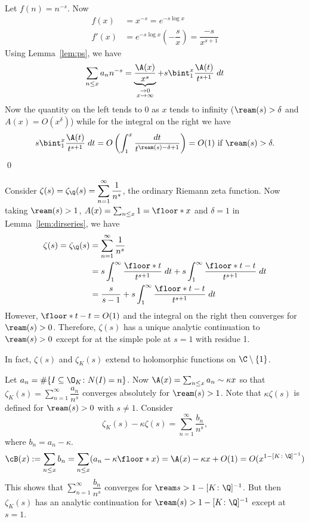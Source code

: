 \pf Let $f(n)= n^{-s}$. Now
	\[
	\begin{split}
	f(x)&=x^{-s}= e^{-s \log x} \\
	f'(x)&= e^{-s \log x} \left(- \dfrac{s}{x}\right)= \dfrac{-s}{x^{s+1}}
	\end{split}
	\]
Using Lemma~\ref{lem:ps}, we have
	\[
	\sum_{n \leq x} a_n n^{-s} = \underbrace{\dfrac{\A(x)}{x^s}}_{\substack{\to 0 \\ x \to \infty}} + s \bint_1^x \dfrac{\A(t)}{t^{s+1}} \; dt
	\]
Now the quantity on the left tends to 0 as $x$ tends to infinity ($\ream(s)>\delta$ and $A(x)=O(x^\delta)$) while for the integral on the right we have
	\[
	s \bint_1^x \dfrac{\A(t)}{t^{s+1}} \; dt= O\left( \int_1^x \dfrac{dt}{t^{\ream(s)-\delta+1}} \right)= O(1) \text{ if } \ream(s)>\delta.
	\]
\qed \\



\begin{ex}
Consider $\displaystyle\zeta(s)=\zeta_\Q(s)= \sum_{n=1}^\infty \dfrac{1}{n^s}$, the ordinary Riemann zeta function. Now taking $\ream(s)>1$, $A(x)= \sum_{n \leq x} 1 = \floor*{x}$ and $\delta=1$ in Lemma~\ref{lem:dirseries}, we have
	\[
	\begin{split}
	\zeta(s)=\zeta_\Q(s)&=\sum_{n=1}^\infty \dfrac{1}{n^s} \\
	&= s \int_1^\infty \dfrac{\floor*{t}}{t^{s+1}} \; dt + s \int_1^\infty \dfrac{\floor*{t} - t}{t^{s+1}} \; dt \\
	&= \dfrac{s}{s-1} + s \int_1^\infty \dfrac{\floor*{t} - t}{t^{s+1}} \; dt
	\end{split}
	\]
However, $\floor*{t}-t=O(1)$ and the integral on the right then converges for $\ream(s)>0$. Therefore, $\zeta(s)$ has a unique analytic continuation to $\ream(s)>0$ except for at the simple pole at $s=1$ with residue 1. \xqed
\end{ex}

\begin{rem}
In fact, $\zeta(s)$ and $\zeta_K(s)$ extend to holomorphic functions on $\C \setminus \{1\}$. 
\end{rem}


\begin{ex}
Let $a_n=\#\{ I \subseteq \O_K \colon N(I)=n\}$. Now $\A(x)= \sum_{n \leq x} a_n \sim \kappa x$ so that $\zeta_K(s)=\sum_{n=1}^\infty \dfrac{a_n}{n^s}$ converges absolutely for $\ream(s)>1$. Note that $\kappa \zeta(s)$ is defined for $\ream(s)>0$ with $s \neq 1$. Consider
	\[
	\zeta_K(s) - \kappa \zeta(s)= \sum_{n=1}^\infty \dfrac{b_n}{n^s},
	\]
where $b_n = a_n - \kappa$. 
	\[
	\cB(x):= \sum_{n \leq x} b_n = \sum_{n \leq x} (a_n - \kappa \floor*{x})= \A(x) - \kappa x + O(1) = O(x^{1-[K \colon \Q]^{-1}})
	\]
This shows that $\sum_{n=1}^\infty \dfrac{b_n}{n^s}$ converges for $\ream s>1- [K \colon \Q]^{-1}$. But then $\zeta_K(s)$ has an analytic continuation for $\ream(s)>1-[K \colon \Q]^{-1}$ except at $s=1$. \xqed
\end{ex}


